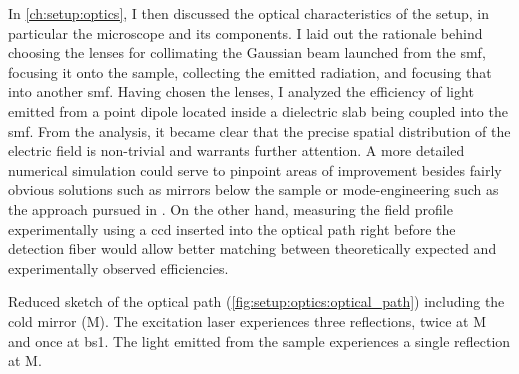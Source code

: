 In \cref{ch:setup:optics}, I then discussed the optical characteristics of the setup, in particular the microscope and its components.
I laid out the rationale behind choosing the lenses for collimating the Gaussian beam launched from the \gls{smf}, focusing it onto the sample, collecting the emitted radiation, and focusing that into another \gls{smf}.
Having chosen the lenses, I analyzed the efficiency of light emitted from a point dipole located inside a dielectric slab being coupled into the \gls{smf}.
From the analysis, it became clear that the precise spatial distribution of the electric field is non-trivial and warrants further attention.
A more detailed numerical simulation could serve to pinpoint areas of improvement besides fairly obvious solutions such as mirrors below the sample or mode-engineering such as the approach pursued in .
On the other hand, measuring the field profile experimentally using a \gls{ccd} inserted into the optical path right before the detection fiber would allow better matching between theoretically expected and experimentally observed efficiencies.

\begin{marginfigure}[*-16]
    
    \caption[]{
        Reduced sketch of the optical path (\cf \cref{fig:setup:optics:optical_path}) including the cold mirror (M).
        The excitation laser experiences three reflections, twice at M and once at \acrshort{bs}1.
        The light emitted from the sample experiences a single reflection at M.
    }
    \label{fig:setup:conclusion:optical_path_reduced}
\end{marginfigure}

